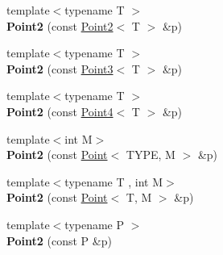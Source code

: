 \begin{Indent}
\begin{DoxyCompactItemize}
{\footnotesize template$<$typename T $>$ }\\{\bfseries Point2} (const \mbox{\hyperlink{classcy_1_1_point2}{Point2}}$<$ T $>$ \&p)
\item 
\mbox{\label{classcy_1_1_point2_a76b000553892013646337d8dd5b733a2}} 
{\footnotesize template$<$typename T $>$ }\\{\bfseries Point2} (const \mbox{\hyperlink{classcy_1_1_point3}{Point3}}$<$ T $>$ \&p)
\item 
\mbox{\label{classcy_1_1_point2_a37f820db6aaef9b5af113995b520ee8b}} 
{\footnotesize template$<$typename T $>$ }\\{\bfseries Point2} (const \mbox{\hyperlink{classcy_1_1_point4}{Point4}}$<$ T $>$ \&p)
\item 
\mbox{\label{classcy_1_1_point2_a705ba26b2cff08e7b1b674f2c7326bb0}} 
{\footnotesize template$<$int M$>$ }\\{\bfseries Point2} (const \mbox{\hyperlink{classcy_1_1_point}{Point}}$<$ T\+Y\+PE, M $>$ \&p)
\item 
\mbox{\label{classcy_1_1_point2_aa4025773ecfe08a457ead6d7b3316b3b}} 
{\footnotesize template$<$typename T , int M$>$ }\\{\bfseries Point2} (const \mbox{\hyperlink{classcy_1_1_point}{Point}}$<$ T, M $>$ \&p)
\item 
\mbox{\label{classcy_1_1_point2_ac260194010d35f95d88173593792ecf4}} 
{\footnotesize template$<$typename P $>$ }\\{\bfseries Point2} (const P \&p)
\end{DoxyCompactItemize}
\end{Indent}
